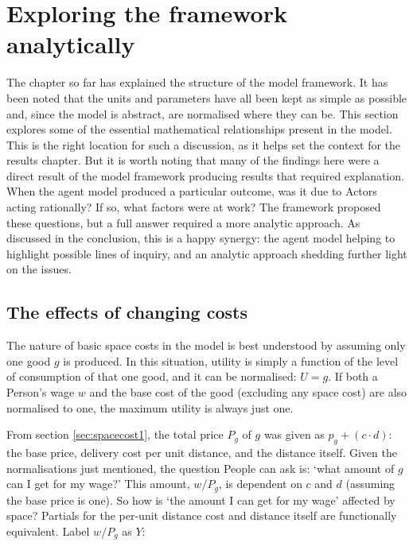 \section{Exploring the framework analytically \label{sec:explorefram}}

The chapter so far has explained the structure of the model framework. It has been noted that the units and parameters have all been kept as simple as possible and, since the model is abstract, are normalised where they can be. This section explores some of the essential mathematical relationships present in the model. This is the right location for such a discussion, as it helps set the context for the results chapter. But it is worth noting that many of the findings here were a direct result of the model framework producing results that required explanation. When the agent model produced a particular outcome, was it due to Actors acting rationally? If so, what factors were at work? The framework proposed these questions, but a full answer required a more analytic approach. As discussed in the conclusion, this is a happy synergy: the agent model helping to highlight possible lines of inquiry, and an analytic approach shedding further light on the issues.

\subsection{The effects of changing costs \label{sec:explorechangingcosts}}

The nature of basic space costs in the model is best understood by assuming only one good $g$ is produced. In this situation, utility is simply a function of the level of consumption of that one good, and it can be normalised: $U = g$. If both a Person's wage $w$ and the base cost of the good (excluding any space cost) are also normalised to one, the maximum utility is always just one.

From section \ref{sec:spacecost1}, the total price $P_g$ of $g$ was given as $p_g + (c \cdot d)$: the base price, delivery cost per unit distance, and the distance itself. Given the normalisations just mentioned, the question People can ask is: `what amount of $g$ can I get for my wage?' This amount, $w / P_g$, is dependent on $c$ and $d$ (assuming the base price is one). So how is `the amount I can get for my wage' affected by space? Partials for the per-unit distance cost and distance itself are functionally equivalent. Label $w / P_g$ as $Y$:

